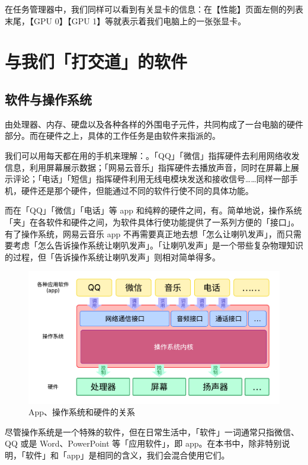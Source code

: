 在任务管理器中，我们同样可以看到有关显卡的信息：在【性能】页面左侧的列表末尾，【GPU 0】【GPU 1】等就表示着我们电脑上的一张张显卡。

\section{与我们「打交道」的软件}

\subsection{软件与操作系统}

由处理器、内存、硬盘以及各种各样的外围电子元件，共同构成了一台电脑的硬件部分。而在硬件之上，具体的工作任务是由软件来指派的。

我们可以用每天都在用的手机来理解：。「QQ」「微信」指挥硬件去利用网络收发信息，利用屏幕展示数据；「网易云音乐」指挥硬件去播放声音，同时在屏幕上展示评论；「电话」「短信」指挥硬件利用无线电模块发送和接收信号……同样一部手机，硬件还是那个硬件，但能通过不同的软件行使不同的具体功能。

而在「QQ」「微信」「电话」等 app 和纯粹的硬件之间，有。简单地说，操作系统「夹」在各软件和硬件之间，为软件具体行使功能提供了一系列方便的「接口」。有了操作系统，网易云音乐 app 不再需要真正地去想「怎么让喇叭发声」，而只需要考虑「怎么告诉操作系统让喇叭发声」。「让喇叭发声」是一个带些复杂物理知识的过程，但「告诉操作系统让喇叭发声」则相对简单得多。

\begin{figure}[htb!]
  \centering
  \includegraphics[width=.85\textwidth]{assets/basic/OS_structure.pdf}
  \caption{App、操作系统和硬件的关系}
  \label{fig:OS_structure}
\end{figure}

\begin{note}
  尽管操作系统是一个特殊的软件，但在日常生活中，「软件」一词通常只指微信、QQ 或是 Word、PowerPoint 等「应用软件」，即 app。在本书中，除非特别说明，「软件」和「app」是相同的含义，我们会混合使用它们。
\end{note}

